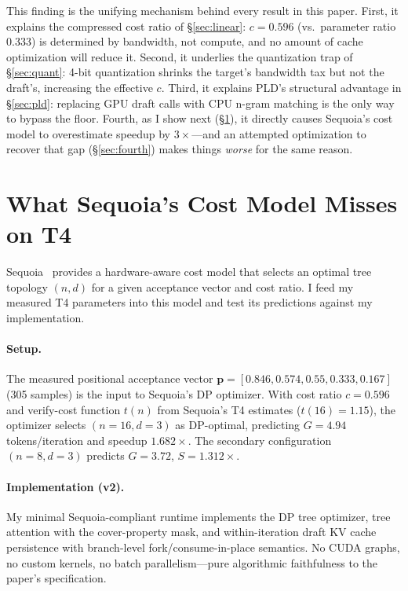 \documentclass[letterpaper,twocolumn,10pt]{article}
\begin{document}
This finding is the unifying mechanism behind every result in this paper.
First, it explains the compressed cost ratio of \S\ref{sec:linear}: $c = 0.596$ (vs.\ parameter ratio $0.333$) is determined by bandwidth, not compute, and no amount of cache optimization will reduce it.
Second, it underlies the quantization trap of \S\ref{sec:quant}: 4-bit quantization shrinks the target's bandwidth tax but not the draft's, increasing the effective $c$.
Third, it explains PLD's structural advantage in \S\ref{sec:pld}: replacing GPU draft calls with CPU n-gram matching is the only way to bypass the floor.
Fourth, as I show next (\S\ref{sec:tree}), it directly causes Sequoia's cost model to overestimate speedup by $3\times$---and an attempted optimization to recover that gap (\S\ref{sec:fourth}) makes things \emph{worse} for the same reason.


\section{What Sequoia's Cost Model Misses on T4}
\label{sec:tree}

Sequoia~\cite{chen2024sequoia} provides a hardware-aware cost model that selects an optimal tree topology $(n, d)$ for a given acceptance vector and cost ratio.
I feed my measured T4 parameters into this model and test its predictions against my implementation.

\paragraph{Setup.}
The measured positional acceptance vector $\mathbf{p} = [0.846, 0.574, 0.55, 0.333, 0.167]$ (305 samples) is the input to Sequoia's DP optimizer.
With cost ratio $c = 0.596$ and verify-cost function $t(n)$ from Sequoia's T4 estimates ($t(16) = 1.15$), the optimizer selects $(n{=}16, d{=}3)$ as DP-optimal, predicting $G = 4.94$ tokens/iteration and speedup $1.682\times$.
The secondary configuration $(n{=}8, d{=}3)$ predicts $G = 3.72$, $S = 1.312\times$.

\paragraph{Implementation (v2).}
My minimal Sequoia-compliant runtime implements the DP tree optimizer, tree attention with the cover-property mask, and within-iteration draft KV cache persistence with branch-level fork/consume-in-place semantics.
No CUDA graphs, no custom kernels, no batch parallelism---pure algorithmic faithfulness to the paper's specification.
\end{document}
